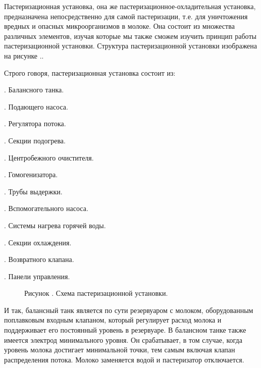 {\gostFont

  \par \redline Пастеризационная установка, она же пастеризационное-охладительная установка, предназначена непосредственно для самой пастеризации, т.е. для уничтожения вредных и опасных микроорганизмов в молоке. Она состоит из множества различных элементов, изучая которые мы также сможем изучить принцип работы пастеризационной установки. Структура пастеризационной установки изображена на рисунке \thechaptercntr .\theimagecntr.

  \par \redline Строго говоря, пастеризационная установка состоит из:

  \par {}. Балансного танка.
  \par {}. Подающего насоса.
  \par {}. Регулятора потока.
  \par {}. Секции подогрева.
  \par {}. Центробежного очистителя.
  \par {}. Гомогенизатора.
  \par {}. Трубы выдержки.
  \par {}. Вспомогательного насоса.
  \par {}. Системы нагрева горячей воды.
  \par {}. Секции охлаждения.
  \par {}. Возвратного клапана.
  \par {}. Панели управления.

  \begin{figure}
    \centering
    \def\svgwidth{\textwidth}
    
    \caption*{\gostFont Рисунок \thechaptercntr .\theimagecntr \spc {--} Схема пастеризационной установки.}
    \label{fig:PUSStructure}
  \end{figure} \addtocounter{imagecntr}{1}

  \par \redline И так, балансный танк является по сути резервуаром с молоком, оборудованным поплавковым входным клапаном, который регулирует расход молока и поддерживает его постоянный уровень в резервуаре. В балансном танке также имеется электрод минимального уровня. Он срабатывает, в том случае, когда уровень молока достигает минимальной точки, тем самым включая клапан распределения потока. Молоко заменяется водой и пастеризатор отключается.

}

